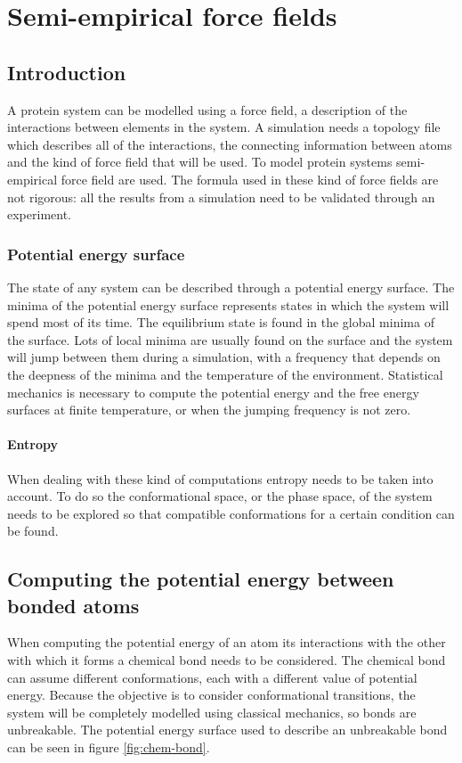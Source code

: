 \graphicspath{{chapters/03/images/}}
\chapter{Semi-empirical force fields}

\section{Introduction}
A protein system can be modelled using a force field, a description of the interactions between elements in the system.
A simulation needs a topology file which describes all of the interactions, the connecting information between atoms and the kind of force field that will be used.
To model protein systems semi-empirical force field are used.
The formula used in these kind of force fields are not rigorous: all the results from a simulation need to be validated through an experiment.

	\subsection{Potential energy surface}
	The state of any system can be described through a potential energy surface.
	The minima of the potential energy surface represents states in which the system will spend most of its time.
	The equilibrium state is found in the global minima of the surface.
	Lots of local minima are usually found on the surface and the system will jump between them during a simulation, with a frequency that depends on the deepness of the minima and the temperature of the environment.
	Statistical mechanics is necessary to compute the potential energy and the free energy surfaces at finite temperature, or when the jumping frequency is not zero.

		\subsubsection{Entropy}
		When dealing with these kind of computations entropy needs to be taken into account.
		To do so the conformational space, or the phase space, of the system needs to be explored so that compatible conformations for a certain condition can be found.


\section{Computing the potential energy between bonded atoms}
When computing the potential energy of an atom its interactions with the other with which it forms a chemical bond needs to be considered.
The chemical bond can assume different conformations, each with a different value of potential energy.
Because the objective is to consider conformational transitions, the system will be completely modelled using classical mechanics, so bonds are unbreakable.
The potential energy surface used to describe an unbreakable bond can be seen in figure \ref{fig:chem-bond}.

